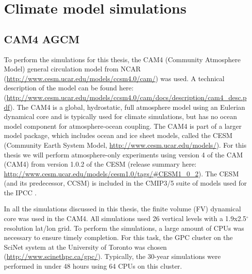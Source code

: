 \documentclass[letterpaper,12pt,titlepage,oneside,final]{book}
\begin{document}
\chapter{Climate model simulations}
\section{CAM4 AGCM}\label{cam4}
To perform the simulations for this thesis, the CAM4 (Community Atmosphere Model) general circulation model from NCAR (\url{http://www.cesm.ucar.edu/models/ccsm4.0/cam/}) was used. A technical description of the model can be found here: (\url{http://www.cesm.ucar.edu/models/ccsm4.0/cam/docs/description/cam4_desc.pdf}). The CAM4 is a global, hydrostatic, full atmosphere model using an Eulerian dynamical core and is typically used for climate simulations, but has no ocean model component for atmosphere-ocean coupling. The CAM4 is part of a larger model package, which includes ocean and ice sheet models, called the CESM (Community Earth System Model, \url{http://www.cesm.ucar.edu/models/}). For this thesis we will perform atmosphere-only experiments using version 4 of the CAM (CAM4) from version 1.0.2 of the CESM (release summary here: \url{http://www.cesm.ucar.edu/models/cesm1.0/tags/#CESM1_0_2}). The CESM (and its predecessor, CCSM) is included in the CMIP3/5 suite of models used for the IPCC \citep{taylor_overview_2011}.

In all the simulations discussed in this thesis, the finite volume (FV) dynamical core was used in the CAM4. All simulations used 26 vertical levels with a 1.9x2.5$^{\circ}$ resolution lat/lon grid. To perform the simulations, a large amount of CPUs was necessary to ensure timely completion. For this task, the GPC cluster on the SciNet system at the University of Toronto was chosen (\url{http://www.scinethpc.ca/gpc/}). Typically, the 30-year simulations were performed in under 48 hours using 64 CPUs on this cluster. 
\end{document}
